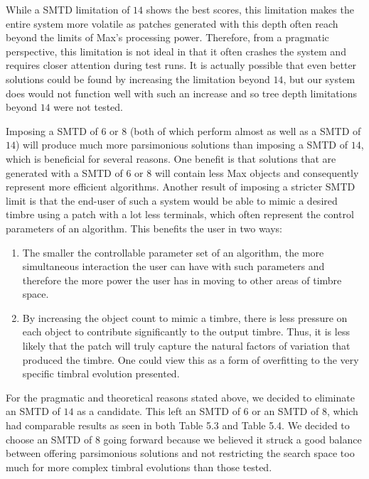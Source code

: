 \documentclass[12pt]{report} 	%
\numberwithin{figure}{chapter}
\numberwithin{table}{chapter}
\numberwithin{equation}{chapter}
\begin{document}
\begin{flushleft}
While a SMTD limitation of $14$ shows the best scores, this limitation makes the entire system more volatile as patches generated with this depth often reach beyond the limits of Max's processing power. Therefore, from a pragmatic perspective, this limitation is not ideal in that it often crashes the system and requires closer attention during test runs. It is actually possible that even better solutions could be found by increasing the limitation beyond $14$, but our system does would not function well with such an increase and so tree depth limitations beyond $14$ were not tested.

Imposing a SMTD of $6$ or $8$ (both of which perform almost as well as a SMTD of $14$) will produce much more parsimonious solutions than imposing a SMTD of $14$, which is beneficial for several reasons. One benefit is that solutions that are generated with a SMTD of $6$ or $8$ will contain less Max objects and consequently represent more efficient algorithms. Another result of imposing a stricter SMTD limit is that the end-user of such a system would be able to mimic a desired timbre using a patch with a lot less terminals, which often represent the control parameters of an algorithm. This benefits the user in two ways:
\begin{enumerate}
\item The smaller the controllable parameter set of an algorithm, the more simultaneous interaction the user can have with such parameters and therefore the more power the user has in moving to other areas of timbre space.
\item By increasing the object count to mimic a timbre, there is less pressure on each object to contribute significantly to the output timbre. Thus, it is less likely that the patch will truly capture the natural factors of variation that produced the timbre. One could view this as a form of overfitting to the very specific timbral evolution presented.
\end{enumerate}
For the pragmatic and theoretical reasons stated above, we decided to eliminate an SMTD of $14$ as a candidate. This left an SMTD of $6$ or an SMTD of $8$, which had comparable results as seen in both Table 5.3 and Table 5.4. We decided to choose an SMTD of $8$ going forward because we believed it struck a good balance between offering parsimonious solutions and not restricting the search space too much for more complex timbral evolutions than those tested.


\end{flushleft}
\end{document}
